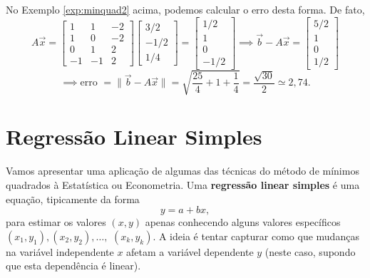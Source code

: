 \documentclass[../livro.tex]{subfiles}  %
\begin{document}
No Exemplo \ref{exp:minquad2} acima, podemos calcular o erro desta forma. De fato,
\[
A \vec{x} = 
\begin{bmatrix}
  1 & 1 & -2 \\ 
  1 & 0 & -2 \\ 
  0 & 1 &  2 \\ 
  -1 & -1&  2
\end{bmatrix}
\begin{bmatrix}
  3/2 \\ -1/2 \\ 1/4
\end{bmatrix} = 
\begin{bmatrix}
  1/2 \\ 1 \\ 0 \\ -1/2
\end{bmatrix} \implies 
\vec{b} - A\vec{x} = 
\begin{bmatrix}
  5/2 \\ 1 \\ 0 \\ 1/2
\end{bmatrix}
\]
\[
\implies \text{erro } = \| \vec{b} - A \vec{x} \| = \sqrt{\frac{25}{4} + 1 + \frac{1}{4}} = \frac{\sqrt{30}}{2} \simeq 2,74.
\]





\section{Regressão Linear Simples}

Vamos apresentar uma aplicação de algumas das técnicas do método de mínimos quadrados à Estatística ou Econometria. Uma \textbf{regressão linear simples} é uma equação, tipicamente da forma
\[
y = a + b x,
\] para estimar os valores $(x,y)$ apenas conhecendo alguns valores específicos $(x_1, y_1), (x_2, y_2), \dots,$ $(x_k, y_k)$. A ideia é tentar capturar como que mudanças na variável independente $x$ afetam a variável dependente $y$ (neste caso, supondo que esta dependência é linear).
\end{document}
